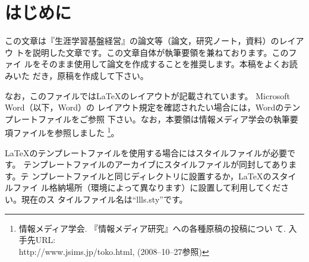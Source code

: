 \documentclass[b5paper,10pt,twocolumn,tombow]{jarticle}
\begin{document}


\tableofcontents{}
\bigskip{}
\section{はじめに}
この文章は『生涯学習基盤経営』の論文等（論文，研究ノート，資料）のレイアウ
トを説明した文章です。この文章自体が執筆要領を兼ねております。このファイ
ルをそのまま使用して論文を作成することを推奨します。本稿をよくお読みいた
だき，原稿を作成して下さい。


なお，このファイルでは\LaTeX{}のレイアウトが記載されています。
Microsoft Word（以下，Word）の
レイアウト規定を確認されたい場合には，Wordのテンプレートファイルをご参照
下さい。なお，本要領は情報メディア学会の執筆要項ファイルを参照しました
\footnote{情報メディア学会. 『情報メディア研究』への各種原稿の投稿につい
て. 入手先URL:\\ http://www.jsims.jp/toko.html, (2008--10--27参照)}。

\LaTeX{}のテンプレートファイルを使用する場合にはスタイルファイルが必要です。
テンプレートファイルのアーカイブにスタイルファイルが同封してあります。テ
ンプレートファイルと同じディレクトリに設置するか，\LaTeX{}のスタイルファイ
ル格納場所（環境によって異なります）に設置して利用してください。現在のス
タイルファイル名は``llls.sty''です。
\end{document}
